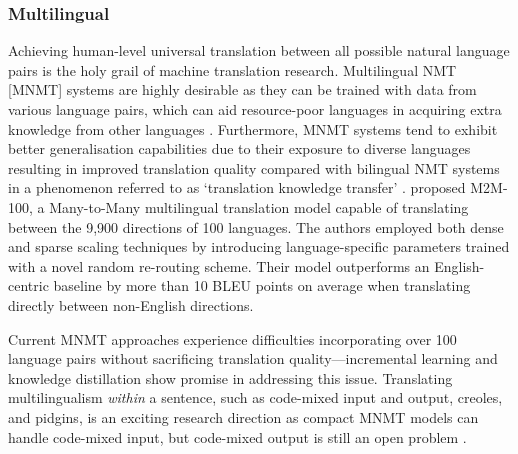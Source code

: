 \documentclass[11pt]{article}
\begin{document}
\subsubsection*{Multilingual}  \vspace{-2mm}
Achieving human-level universal translation between all possible natural language pairs is the holy grail of machine translation research.
Multilingual NMT [MNMT] systems are highly desirable as they can be trained with data from various language pairs, which can aid resource-poor languages in acquiring extra knowledge from other languages \citep{shatz2017native}. 
Furthermore, MNMT systems tend to exhibit better generalisation capabilities due to their exposure to diverse languages resulting in improved translation quality compared with bilingual NMT systems in a phenomenon referred to as `translation knowledge transfer' \citep{5288526}.
\cite{fan2021beyond} proposed M2M-100, a Many-to-Many multilingual translation model capable of translating between the 9,900 directions of 100 languages. The authors employed both dense and sparse scaling techniques by introducing language-specific parameters trained with a novel random re-routing scheme. Their model outperforms an English-centric baseline by more than 10 BLEU points on average when translating directly between non-English directions.

Current MNMT approaches experience difficulties incorporating over 100 language pairs without sacrificing translation quality—incremental learning and knowledge distillation show promise in addressing this issue.
Translating multilingualism \textit{within} a sentence, such as code-mixed input and output, creoles, and pidgins, is an exciting research direction as compact MNMT models can handle code-mixed input, but code-mixed output is still an open problem \citep{johnson-etal-2017-googles}.
\end{document}
